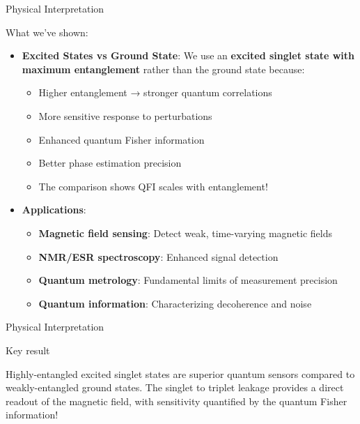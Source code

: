\documentclass{beamer}
\begin{document}
\begin{frame}{Physical Interpretation}

\begin{alertblock}{What we've shown:}
\begin{itemize}
\item \textbf{Excited States vs Ground State}: We use an \textbf{excited singlet state with maximum entanglement} rather than the ground state because:
\begin{itemize}
\item Higher entanglement → stronger quantum correlations
\item More sensitive response to perturbations
\item Enhanced quantum Fisher information
\item Better phase estimation precision
\item The comparison shows QFI scales with entanglement!
\end{itemize}
\item  \textbf{Applications}:
\begin{itemize}
\item \textbf{Magnetic field sensing}: Detect weak, time-varying magnetic fields
\item \textbf{NMR/ESR spectroscopy}: Enhanced signal detection
\item \textbf{Quantum metrology}: Fundamental limits of measurement precision
\item \textbf{Quantum information}: Characterizing decoherence and noise
\end{itemize}
\end{itemize}
\end{alertblock}
\end{frame}

\begin{frame}{Physical Interpretation}
\begin{alertblock}{Key result}

Highly-entangled excited singlet states are superior quantum sensors
compared to weakly-entangled ground states. The singlet to triplet
leakage provides a direct readout of the magnetic field, with
sensitivity quantified by the quantum Fisher information!
\end{alertblock}
\end{frame}
\end{document}
